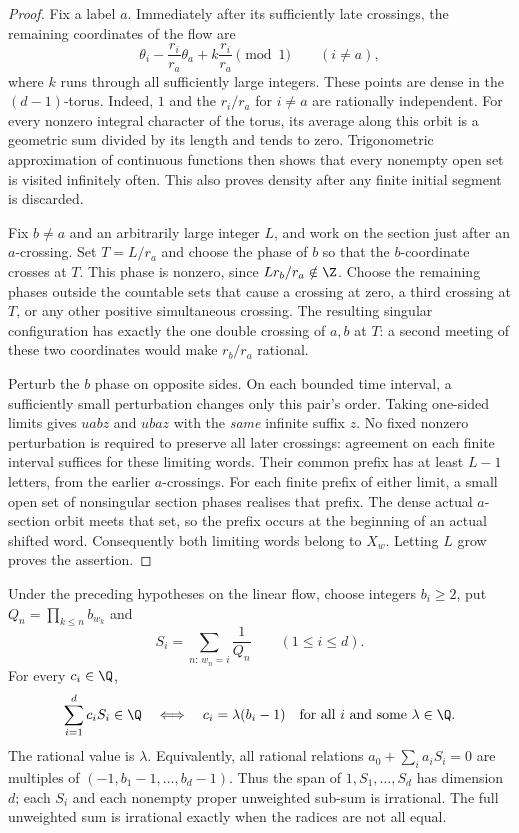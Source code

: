\begin{proof}
Fix a label $a$.  Immediately after its sufficiently late crossings,
the remaining coordinates of the flow are
\[
 \theta_i-\frac{r_i}{r_a}\theta_a
       +k\frac{r_i}{r_a}\pmod1\qquad(i\ne a),
\]
where $k$ runs through all sufficiently large integers.  These points
are dense in the $(d-1)$-torus.  Indeed, $1$ and the $r_i/r_a$ for $i\ne a$
are rationally independent.  For every nonzero integral character of
the torus, its average along this orbit is a geometric sum divided by
its length and tends to zero.  Trigonometric approximation of continuous
functions then shows that every nonempty open set is visited infinitely
often.  This also proves density after any finite initial segment is
discarded.

Fix $b\ne a$ and an arbitrarily large integer $L$, and work on the section
just after an $a$-crossing.  Set $T=L/r_a$ and choose the phase of $b$ so
that the $b$-coordinate crosses at $T$.  This phase is nonzero, since
$Lr_b/r_a\notin\Z$.  Choose the remaining phases outside the countable
sets that cause a crossing at zero, a third crossing at $T$, or any other
positive simultaneous crossing.  The resulting singular configuration has
exactly the one double crossing of $a,b$ at $T$: a second meeting of these
two coordinates would make $r_b/r_a$ rational.

Perturb the $b$ phase on opposite sides. On each bounded time interval,
a sufficiently small perturbation changes only this pair's order.
Taking one-sided limits gives $uabz$ and $ubaz$ with the \emph{same}
infinite suffix $z$. No fixed nonzero perturbation is required to preserve
all later crossings: agreement on each finite interval suffices for these
limiting words.  Their common prefix has at least $L-1$ letters,
from the earlier $a$-crossings.  For each finite prefix of either limit,
a small open set of nonsingular section phases realises that prefix.
The dense actual $a$-section orbit meets that set, so the prefix occurs
at the beginning of an actual shifted word.  Consequently both limiting
words belong to $X_w$.  Letting $L$ grow proves the assertion.
\end{proof}

\begin{remark}
\label{long269:thm:clock-relations}
Under the preceding hypotheses on the linear flow, choose integers $b_i\ge2$, put
$Q_n=\prod_{k\le n}b_{w_k}$ and
\[
 S_i=\sum_{n:\,w_n=i}\frac1{Q_n}\qquad(1\le i\le d).
\]
For every $c_i\in\Q$,
\[
 \sum_{i=1}^dc_iS_i\in\Q
 \quad\Longleftrightarrow\quad
 c_i=\lambda(b_i-1)\quad\hbox{for all $i$ and some $\lambda\in\Q$}.
\]
The rational value is $\lambda$.  Equivalently, all rational relations
$a_0+\sum_i a_iS_i=0$ are multiples of
$(-1,b_1-1,\ldots,b_d-1)$.  Thus the span of
$1,S_1,\ldots,S_d$ has dimension $d$; each $S_i$ and each nonempty
proper unweighted sub-sum is irrational.  The full unweighted sum is
irrational exactly when the radices are not all equal.
\end{remark}

